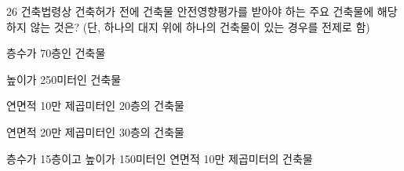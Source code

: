 \begin{question}{26}
건축법령상 건축허가 전에 건축물 안전영향평가를 받아야 하는 주요 건축물에 해당하지 않는 것은? (단, 하나의 대지 위에 하나의 건축물이 있는 경우를 전제로 함)
\begin{choices}
  \item 층수가 70층인 건축물
  \item 높이가 250미터인 건축물
  \item 연면적 10만 제곱미터인 20층의 건축물
  \item 연면적 20만 제곱미터인 30층의 건축물
  \item 층수가 15층이고 높이가 150미터인 연면적 10만 제곱미터의 건축물
\end{choices}
\end{question}
